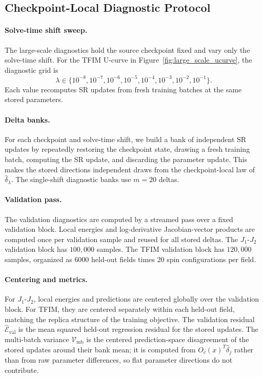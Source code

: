\subsection{Checkpoint-Local Diagnostic Protocol}

\paragraph{Solve-time shift sweep.}
The large-scale diagnostics hold the source checkpoint fixed and vary only the
solve-time shift. For the TFIM U-curve in Figure~\ref{fig:large_scale_ucurve},
the diagnostic grid is
\[
    \lambda\in\{10^{-8},10^{-7},10^{-6},10^{-5},10^{-4},10^{-3},10^{-2},10^{-1}\}.
\]
Each value recomputes SR updates from fresh training batches at the same stored
parameters.

\paragraph{Delta banks.}
For each checkpoint and solve-time shift, we build a bank of independent SR
updates by repeatedly restoring the checkpoint state, drawing a fresh training
batch, computing the SR update, and discarding the parameter update. This makes
the stored directions independent draws from the checkpoint-local law of
$\hat\delta_\lambda$. The single-shift diagnostic banks use $m=20$ deltas.

\paragraph{Validation pass.}
The validation diagnostics are computed by a streamed pass over a fixed
validation block. Local energies and log-derivative Jacobian-vector products are
computed once per validation sample and reused for all stored deltas. The
$J_1$-$J_2$ validation block has $100{,}000$ samples. The TFIM validation block
has $120{,}000$ samples, organized as $6000$ held-out fields times $20$ spin
configurations per field.

\paragraph{Centering and metrics.}
For $J_1$-$J_2$, local energies and predictions are centered globally over the
validation block. For TFIM, they are centered separately within each held-out
field, matching the replica structure of the training objective. The validation
residual $\widehat{\mathcal E}_{\mathrm{val}}$ is the mean squared held-out
regression residual for the stored updates. The multi-batch variance
$\mathcal V_{\mathrm{mb}}$ is the centered prediction-space disagreement of the
stored updates around their bank mean; it is computed from
$O_c(x)^T\hat\delta_j$ rather than from raw parameter differences, so flat
parameter directions do not contribute.


